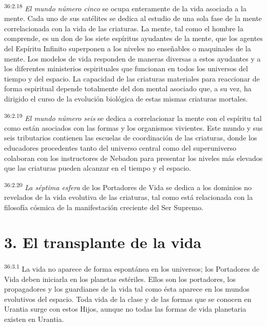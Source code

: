 \par
\textsuperscript{36:2.18} \textit{El mundo número cinco} se ocupa enteramente de la vida asociada a la mente. Cada uno de sus satélites se dedica al estudio de una sola fase de la mente correlacionada con la vida de las criaturas. La mente, tal como el hombre la comprende, es un don de los siete espíritus ayudantes de la mente, que los agentes del Espíritu Infinito superponen a los niveles no enseñables o maquinales de la mente. Los modelos de vida responden de maneras diversas a estos ayudantes y a los diferentes ministerios espirituales que funcionan en todos los universos del tiempo y del espacio. La capacidad de las criaturas materiales para reaccionar de forma espiritual depende totalmente del don mental asociado que, a su vez, ha dirigido el curso de la evolución biológica de estas mismas criaturas mortales.

\par
\textsuperscript{36:2.19} \textit{El mundo número seis} se dedica a correlacionar la mente con el espíritu tal como están asociados con las formas y los organismos vivientes. Este mundo y sus seis tributarios contienen las escuelas de coordinación de las criaturas, donde los educadores procedentes tanto del universo central como del superuniverso colaboran con los instructores de Nebadon para presentar los niveles más elevados que las criaturas pueden alcanzar en el tiempo y el espacio.

\par
\textsuperscript{36:2.20} \textit{La séptima esfera} de los Portadores de Vida se dedica a los dominios no revelados de la vida evolutiva de las criaturas, tal como está relacionada con la filosofía cósmica de la manifestación creciente del Ser Supremo.

\section*{3. El transplante de la vida}
\par
\textsuperscript{36:3.1} La vida no aparece de forma espontánea en los universos; los Portadores de Vida deben iniciarla en los planetas estériles. Ellos son los portadores, los propagadores y los guardianes de la vida tal como ésta aparece en los mundos evolutivos del espacio. Toda vida de la clase y de las formas que se conocen en Urantia surge con estos Hijos, aunque no todas las formas de vida planetaria existen en Urantia.

